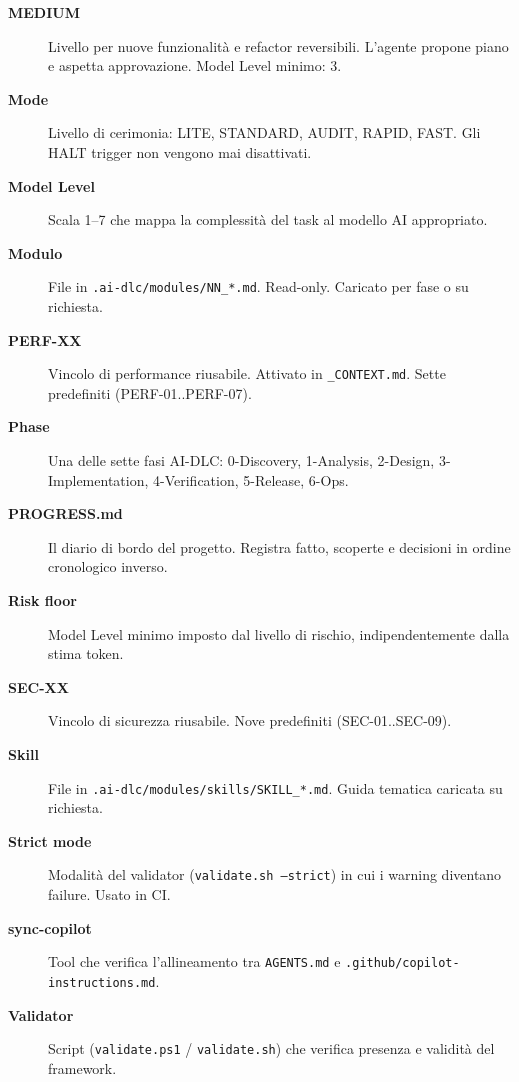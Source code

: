 \begin{description}
\item[\textbf{MEDIUM}] Livello per nuove funzionalità e refactor reversibili. L'agente propone piano e aspetta approvazione. Model Level minimo: 3.

\item[\textbf{Mode}] Livello di cerimonia: LITE, STANDARD, AUDIT, RAPID, FAST. Gli HALT trigger non vengono mai disattivati.

\item[\textbf{Model Level}] Scala 1--7 che mappa la complessità del task al modello AI appropriato.

\item[\textbf{Modulo}] File in \texttt{.ai-dlc/modules/NN\_*.md}. Read-only. Caricato per fase o su richiesta.

\item[\textbf{PERF-XX}] Vincolo di performance riusabile. Attivato in \texttt{\_CONTEXT.md}. Sette predefiniti (PERF-01..PERF-07).

\item[\textbf{Phase}] Una delle sette fasi AI-DLC: 0-Discovery, 1-Analysis, 2-Design, 3-Implementation, 4-Verification, 5-Release, 6-Ops.

\item[\textbf{PROGRESS.md}] Il diario di bordo del progetto. Registra fatto, scoperte e decisioni in ordine cronologico inverso.

\item[\textbf{Risk floor}] Model Level minimo imposto dal livello di rischio, indipendentemente dalla stima token.

\item[\textbf{SEC-XX}] Vincolo di sicurezza riusabile. Nove predefiniti (SEC-01..SEC-09).

\item[\textbf{Skill}] File in \texttt{.ai-dlc/modules/skills/SKILL\_*.md}. Guida tematica caricata su richiesta.

\item[\textbf{Strict mode}] Modalità del validator (\texttt{validate.sh --strict}) in cui i warning diventano failure. Usato in CI.

\item[\textbf{sync-copilot}] Tool che verifica l'allineamento tra \texttt{AGENTS.md} e \texttt{.github/copilot-instructions.md}.

\item[\textbf{Validator}] Script (\texttt{validate.ps1} / \texttt{validate.sh}) che verifica presenza e validità del framework.

\end{description}
